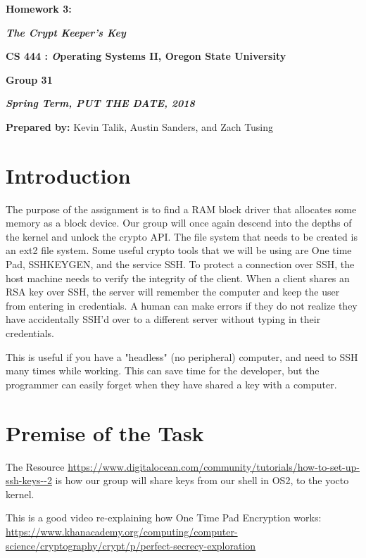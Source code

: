\documentclass[onecolumn, draftclsnofoot,10pt, compsoc]{IEEEtran}
\def \GroupMemberOne{			Kevin Talik}
\def \GroupMemberTwo{			Austin Sanders}
\def \GroupMemberThree{			Zach Tusing}
\begin{document}
 	\begin{center}
	\huge\bf{ Homework 3:} 
   
    \large\textbf{\textit{ The Crypt Keeper's Key }}\par
     
    
    
	\small{\bf CS 444 : \textit Operating Systems II, Oregon State University}\par
    \small{\bf{Group 31}}
    
    
    {\bf\textit{ Spring Term, PUT THE DATE, 2018} }
    
    
    {\small {\bf Prepared by:} \GroupMemberOne, \GroupMemberTwo, and \GroupMemberThree }
        \end{center}
 		\vfill

       \pagebreak
       \section{ Introduction}
	The purpose of the assignment is to find a RAM block driver that allocates some memory as a block device. Our group will once again descend into the depths of the kernel and unlock the crypto API.
	The file system that needs to be created is an ext2 file system. Some useful crypto tools that we will be using are One time Pad, SSHKEYGEN, and the service SSH. To protect a connection over SSH, the host machine needs to verify the integrity of the client. 
	When a client shares an RSA key over SSH, the server will remember the computer and keep the user from entering in credentials.
	A human can make errors if they do not realize they have accidentally SSH'd over to a different server without typing in their credentials. 

	This is useful if you have a "headless" (no peripheral) computer, and need to SSH many times while working. This can save time for the developer, but the programmer can easily forget when they have shared a key with a computer.
	\section{ Premise of the Task }
	The Resource \url{https://www.digitalocean.com/community/tutorials/how-to-set-up-ssh-keys--2} is how our group will share keys from our shell in OS2, to the yocto kernel.

    This is a good video re-explaining how One Time Pad Encryption works: \url{ https://www.khanacademy.org/computing/computer-science/cryptography/crypt/p/perfect-secrecy-exploration}
        
\end{document}
